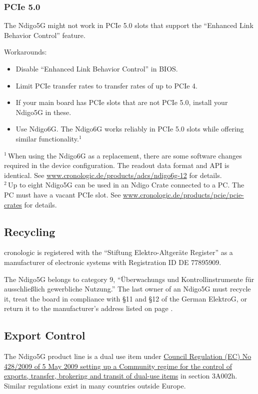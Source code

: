 \subsubsection{PCIe 5.0}
The Ndigo5G might not work in PCIe 5.0 slots that support the ``Enhanced Link Behavior Control'' feature.\par
Workarounds:
\begin{itemize}
    \item Disable ``Enhanced Link Behavior Control'' in BIOS.
    \item Limit PCIe transfer rates to transfer rates of up to PCIe 4.
    \item If your main board has PCIe slots that are not PCIe 5.0, install your Ndigo5G in these.
    \item Use Ndigo6G. The Ndigo6G works reliably in PCIe 5.0 slots while offering similar functionality.$^1$
\end{itemize}
{\small $^1$\,When using the Ndigo6G as a replacement, there are some software changes required in the device configuration. The readout data format and API is identical. See \href{https://www.cronologic.de/products/adcs/ndigo6g-12}{www.cronologic.de/products/adcs/ndigo6g-12} for details.}\\
{\small $^2$\,Up to eight Ndigo5G can be used in an Ndigo Crate connected to a PC. The PC must have a vacant PCIe slot. See \href{https://www.cronologic.de/products/pcie/pcie-crates}{www.cronologic.de/products/pcie/pcie-crates} for details.}


\subsection{Recycling}

    cronologic is registered with the ``Stiftung Elektro-Altgeräte Register'' as a manufacturer of electronic systems with Registration ID DE 77895909.\par

    The Ndigo5G belongs to category 9, ``Überwachungs und Kontrollinstrumente f\"u{}r aus\-schlie\ss lich gewerbliche Nutzung.'' The last owner of an Ndigo5G must recycle it, treat the board in compliance with \S{}11 and \S{}12 of the German ElektroG, or return it to the manufacturer's address listed on page \pageref{cp:manu}.

\subsection{Export Control}
The Ndigo5G product line is a dual use item under \href{https://eur-lex.europa.eu/eli/reg/2009/428/oj}{Council Regulation (EC) No 428/2009 of 5 May 2009 setting up a Community regime for the control of exports, transfer, brokering and transit of dual-use items} in section 3A002h. Similar regulations exist in many countries outside Europe.


